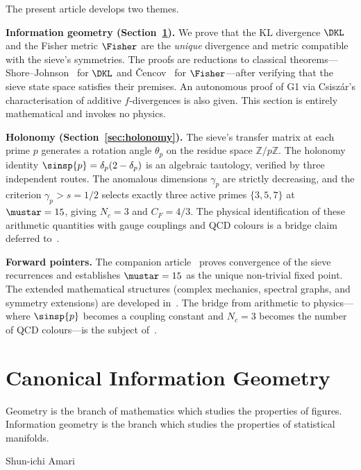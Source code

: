 \documentclass[12pt,a4paper]{article}
\begin{document}
The present article develops two themes.

\textbf{Information geometry (Section~\ref{sec:geometry}).}
We prove that the KL divergence $\DKL$ and the Fisher metric $\Fisher$
are the \emph{unique} divergence and metric compatible with the sieve's
symmetries.  The proofs are reductions to classical
theorems---Shore--Johnson~\cite{ShoreJohnson1980} for $\DKL$ and
\v{C}encov~\cite{Cencov1982} for $\Fisher$---after verifying that the
sieve state space satisfies their premises.  An autonomous proof of G1
via Csisz\'ar's characterisation of additive $f$-divergences is also
given.  This section is entirely mathematical and invokes no physics.

\textbf{Holonomy (Section~\ref{sec:holonomy}).}
The sieve's transfer matrix at each prime $p$ generates a rotation
angle $\theta_p$ on the residue space $\mathbb{Z}/p\mathbb{Z}$.  The
holonomy identity $\sinsp{p} = \delta_p(2 - \delta_p)$ is an algebraic
tautology, verified by three independent routes.  The anomalous
dimensions $\gamma_p$ are strictly decreasing, and the criterion
$\gamma_p > s = 1/2$ selects exactly three active primes
$\{3, 5, 7\}$ at $\mustar = 15$, giving $N_c = 3$ and
$C_F = 4/3$.  The physical identification of these arithmetic
quantities with gauge couplings and QCD colours is a bridge
claim deferred to~\cite{companion_M5}.

\medskip\noindent\textbf{Forward pointers.}
The companion article~\cite{companion_M3} proves convergence of the
sieve recurrences and establishes $\mustar = 15$ as the unique
non-trivial fixed point.  The extended mathematical structures
(complex mechanics, spectral graphs, and symmetry extensions) are
developed in~\cite{companion_M4}.  The bridge from arithmetic to
physics---where $\sinsp{p}$ becomes a coupling constant and $N_c = 3$
becomes the number of QCD colours---is the subject
of~\cite{companion_M5}.



\section{Canonical Information Geometry}
\label{sec:geometry}

\epigraph{Geometry is the branch of mathematics which studies the properties
of figures. Information geometry is the branch which studies
the properties of statistical manifolds.}{Shun-ichi Amari}
\end{document}
